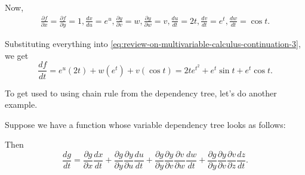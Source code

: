 \begin{example}
	Now,
	\[
		\begin{gathered}
			\frac{\partial f}{\partial x}
			=\frac{\partial f}{\partial y}=1,
			\frac{dx}{du}=e^u,
			\frac{\partial y}{\partial v}=w,
			\frac{\partial y}{\partial w}=v,
			\frac{du}{dt}=2t,
			\frac{dv}{dt}=e^t,
			\frac{dw}{dt}=\cos t.
		\end{gathered}
	\]

	Substituting everything into \autoref{eq:review-on-multivariable-calculus-continuation-3}, we get
	\begin{equation}
		\frac{df}{dt}
		=e^u(2t)+w(e^t)+v(\cos t)
		=2te^{t^2}+e^t\sin t+e^t\cos t.
		\label{eq:review-on-multivariable-calculus-continuation-4}
	\end{equation}
\end{example}

To get used to using chain rule from the dependency tree, let's do another example.

\begin{example}\label{ex:review-on-multivariable-calculus-continuation-2}
	Suppose we have a function whose variable dependency tree looks as follows:
	\begin{center}
	\end{center}
	Then
	\begin{equation}
		\frac{dg}{dt} = \frac{\partial g}{\partial x}\frac{dx}{dt}+\frac{\partial g}{\partial y} \frac{\partial y}{\partial u}\frac{du}{dt}+\frac{\partial g}{\partial y} \frac{\partial y}{\partial v} \frac{\partial v}{\partial w}\frac{dw}{dt}+\frac{\partial g}{\partial y} \frac{\partial y}{\partial v} \frac{\partial v}{\partial z}\frac{dz}{dt}.
		\label{eq:review-on-multivariable-calculus-continuation-5}
	\end{equation}
\end{example}

